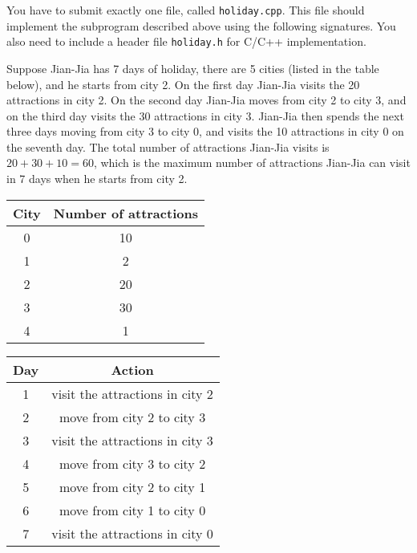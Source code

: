 You have to submit exactly one file, called \texttt{holiday.cpp}. This file should implement the subprogram described above using the following signatures. You also need to
include a header file \texttt{holiday.h} for C/C++ implementation.

Suppose Jian-Jia has 7 days of holiday, there are 5 cities (listed in the table below), and he starts from city 2. On the first day Jian-Jia visits the 20 attractions in city 2. On the second day Jian-Jia moves from city 2 to city 3, and on the third day visits the 30 attractions in city 3. Jian-Jia then spends the next three days moving from city 3 to city 0, and visits the 10 attractions in city 0 on the seventh day. The total number of attractions Jian-Jia visits is $20 + 30 + 10 = 60$, which is the maximum number of
attractions Jian-Jia can visit in 7 days when he starts from city 2.

\begin{center}
\renewcommand{\arraystretch}{1.5}
\begin{tabular}{|c|c|}
\hline
City & Number of attractions \\
\hline
0 &  10 \\
\hline
1 &  2 \\
\hline
2 & 20 \\
\hline
3 & 30 \\
\hline
4 & 1 \\
\hline
\end{tabular}
\end{center}

\begin{center}
\renewcommand{\arraystretch}{1.5}
\begin{tabular}{|c|c|}
\hline
Day & Action \\
\hline
1 & visit the attractions in city 2 \\
\hline
2 & move from city 2 to city 3 \\
\hline
3 & visit the attractions in city 3 \\
\hline
4 & move from city 3 to city 2 \\
\hline
5 & move from city 2 to city 1 \\
\hline
6 & move from city 1 to city 0 \\
\hline
7 & visit the attractions in city 0 \\
\hline
\end{tabular}
\end{center}